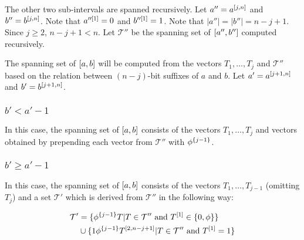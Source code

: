 The other two sub-intervals are spanned recursively.
Let $a'' = a^{[j, n]}$ and $b'' = b^{[j, n]}$.
Note that $a''^{[1]} = 0$ and $b''^{[1]} = 1$.
Note that $|a''| = |b''| = n - j + 1$.
Since $j \geq 2$, $n-j+1 < n$.
Let $\mathcal{T}''$ be the spanning set
of $[a'', b'']$ computed recursively.

The spanning set of $[a, b]$ will be computed
from the vectors $T_1, \ldots, T_j$ and $\mathcal{T}''$
based on the relation between $(n-j)$-bit suffixes of $a$
and $b$.
Let $a' = a^{[j+1, n]}$ and $b' = b^{[j+1, n]}$.

\subsubsection{\texorpdfstring
{$b' < a' - 1$}
{b' < a' - 1}
}

In this case,
the spanning set of $[a, b]$ consists
of the vectors $T_1, \ldots, T_j$ and vectors obtained
by prepending each vector from $\mathcal{T}''$ with
$\phi^{\{j-1\}}$.

\subsubsection{\texorpdfstring
{$b' \geq a' - 1$}
{b' >= a' - 1}
}

In this case,
the spanning set of $[a, b]$ consists
of the vectors $T_1, \ldots, T_{j-1}$ (omitting $T_j$)
and a set $\mathcal{T}'$ which is derived
from $\mathcal{T}''$
in the following way:

\begin{align*}
\mathcal{T}' &= \{
\phi^{\{j-1\}} T | T \in \mathcal{T}'' \text{ and }
T^{[1]} \in \{0, \phi\}
\} \\
&\cup \{
1 \phi^{\{j-1\}} T^{[2, n-j+1]} | T \in \mathcal{T}''
\text{ and } T^{[1]} = 1
\}
\end{align*}

